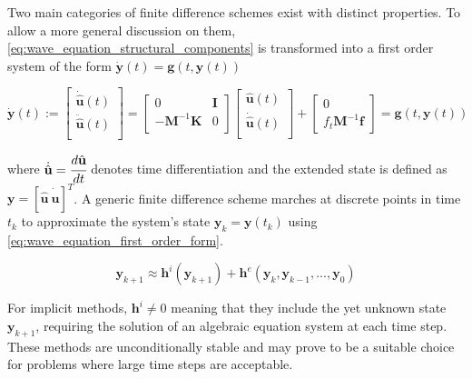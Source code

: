 Two main categories of finite difference schemes exist with distinct properties. To allow a more general discussion on them, \ref{eq:wave_equation_structural_components} is transformed into a first order system of the form $\dot{\mathbf y}(t) = \mathbf g(t, \mathbf y(t))$

\begin{equation} \label{eq:wave_equation_first_order_form}
	\dot{\mathbf y}(t) := 
	\begin{bmatrix}
		\dot{\hat{\mathbf u}}(t) \\
		\ddot{\hat{\mathbf u}}(t) \\
	\end{bmatrix}
	=
	\begin{bmatrix}
		0 & \mathbf I \\
		- \mathbf M^{-1} \mathbf K & 0 \\
	\end{bmatrix}
	\begin{bmatrix}
		\hat{\mathbf u}(t) \\
		\dot{\hat{\mathbf u}}(t) \\
	\end{bmatrix}
	+
	\begin{bmatrix}
		0 \\
		f_t \mathbf M^{-1} \mathbf f
	\end{bmatrix}
	=
	\mathbf g(t, \mathbf y(t))
\end{equation}

where $\dot{\hat{\mathbf u}} = \cfrac{d \hat{\mathbf u}}{d t}$ denotes time differentiation and the extended state is defined as $\mathbf y = [\hat{\mathbf u} \ \dot{\hat{\mathbf u}}]^T$. A generic finite difference scheme marches at discrete points in time $t_k$ to approximate the system's state $\mathbf y_k = \mathbf y(t_k)$ using \ref{eq:wave_equation_first_order_form}.

\begin{equation} \label{eq:generic_finite_differences}
	\mathbf y_{k+1} \approx \mathbf h^i(\mathbf y_{k+1}) + \mathbf h^e(\mathbf y_k, \mathbf y_{k-1}, ..., \mathbf y_0)
\end{equation}

For implicit methods, $\mathbf h^i \neq 0$ meaning that they include the yet unknown state $\mathbf y_{k+1}$, requiring the solution of an algebraic equation system at each time step. These methods are unconditionally stable and may prove to be a suitable choice for problems where large time steps are acceptable.

